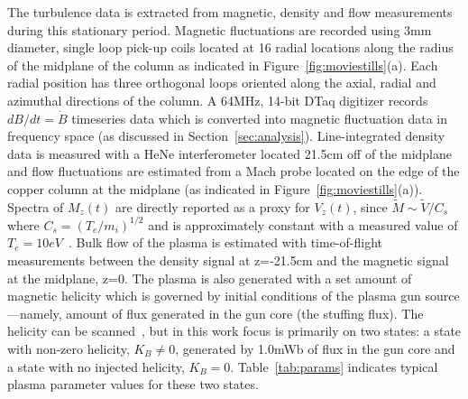 \documentclass[aip,prl,amsmath,amssymb,reprint,superscriptaddress]{revtex4-1} %
\begin{document}
The turbulence data is extracted from magnetic, density and flow measurements during this stationary period. Magnetic fluctuations are recorded using 3mm diameter, single loop pick-up coils located at 16 radial locations along the radius of the midplane of the column as indicated in Figure~\ref{fig:moviestills}(a). Each radial position has three orthogonal loops oriented along the axial, radial and azimuthal directions of the column. A 64MHz, 14-bit DTaq digitizer records $dB/dt = \dot{B}$ timeseries data which is converted into magnetic fluctuation data in frequency space (as discussed in Section~\ref{sec:analysis}). Line-integrated density data is measured with a HeNe interferometer located 21.5cm off of the midplane and flow fluctuations are estimated from a Mach probe located on the edge of the copper column at the midplane (as indicated in Figure~\ref{fig:moviestills}(a)). Spectra of $M_{z}(t)$ are directly reported as a proxy for $V_{z}(t)$, since $\tilde{M}\sim \tilde{V}/C_{s}$ where $C_{s}=(T_{e}/m_{i})^{1/2}$ and is approximately constant with a measured value of $T_{e}=10eV$~\cite{zhang11, schaffner14b}. Bulk flow of the plasma is estimated with time-of-flight measurements between the density signal at z=-21.5cm and the magnetic signal at the midplane, z=0. The plasma is also generated with a set amount of magnetic helicity which is governed by initial conditions of the plasma gun source---namely, amount of flux generated in the gun core (the stuffing flux). The helicity can be scanned~\cite{schaffner14b}, but in this work focus is primarily on two states: a state with non-zero helicity, $K_{B}\neq 0$, generated by 1.0mWb of flux in the gun core and a state with no injected helicity, $K_{B}=0$. Table~\ref{tab:params} indicates typical plasma parameter values for these two states.




\end{document}
